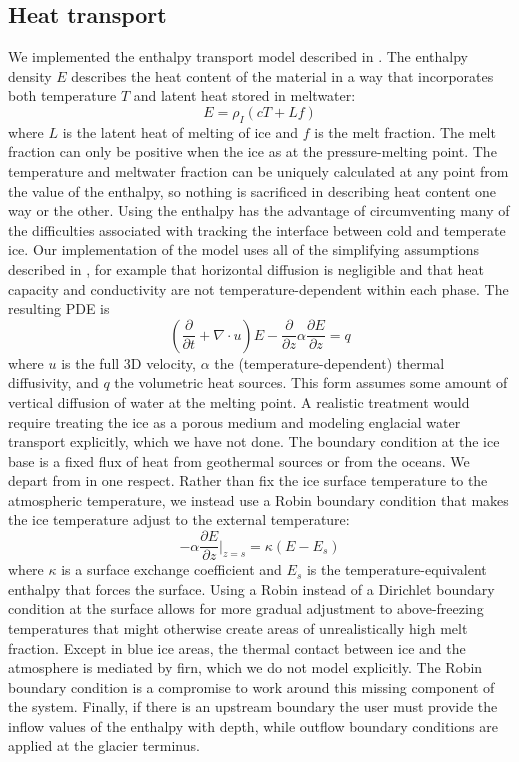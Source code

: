 \documentclass[journal abbreviation, manuscript]{copernicus}
\begin{document}
\subsection{Heat transport} \label{sec:heat-transport}

We implemented the enthalpy transport model described in \citet{aschwanden2012enthalpy}.
The enthalpy density $E$ describes the heat content of the material in a way that incorporates both temperature $T$ and latent heat stored in meltwater:
\begin{equation}
    E = \rho_I(cT + Lf)
\end{equation}
where $L$ is the latent heat of melting of ice and $f$ is the melt fraction.
The melt fraction can only be positive when the ice as at the pressure-melting point.
The temperature and meltwater fraction can be uniquely calculated at any point from the value of the enthalpy, so nothing is sacrificed in describing heat content one way or the other.
Using the enthalpy has the advantage of circumventing many of the difficulties associated with tracking the interface between cold and temperate ice.
Our implementation of the model uses all of the simplifying assumptions described in \citet{aschwanden2012enthalpy}, for example that horizontal diffusion is negligible and that heat capacity and conductivity are not temperature-dependent within each phase.
The resulting PDE is
\begin{equation}
    \left(\frac{\partial}{\partial t} + \nabla\cdot u\right)E - \frac{\partial}{\partial z}\alpha\frac{\partial E}{\partial z} = q
\end{equation}
where $u$ is the full 3D velocity, $\alpha$ the (temperature-dependent) thermal diffusivity, and $q$ the volumetric heat sources.
This form assumes some amount of vertical diffusion of water at the melting point.
A realistic treatment would require treating the ice as a porous medium and modeling englacial water transport explicitly, which we have not done.
The boundary condition at the ice base is a fixed flux of heat from geothermal sources or from the oceans.
We depart from \citet{aschwanden2012enthalpy} in one respect.
Rather than fix the ice surface temperature to the atmospheric temperature, we instead use a Robin boundary condition that makes the ice temperature adjust to the external temperature:
\begin{equation}
    -\alpha\frac{\partial E}{\partial z}\Big|_{z = s} = \kappa(E - E_s)
\end{equation}
where $\kappa$ is a surface exchange coefficient and $E_s$ is the temperature-equivalent enthalpy that forces the surface.
Using a Robin instead of a Dirichlet boundary condition at the surface allows for more gradual adjustment to above-freezing temperatures that might otherwise create areas of unrealistically high melt fraction.
Except in blue ice areas, the thermal contact between ice and the atmosphere is mediated by firn, which we do not model explicitly.
The Robin boundary condition is a compromise to work around this missing component of the system.
Finally, if there is an upstream boundary the user must provide the inflow values of the enthalpy with depth, while outflow boundary conditions are applied at the glacier terminus.
\end{document}
